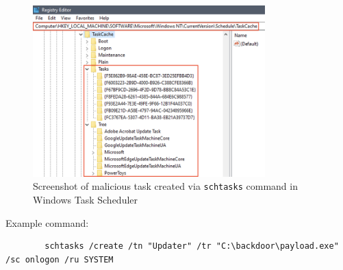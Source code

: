 

\begin{figure}[H]
    \centering
    \includegraphics[width=0.8\textwidth]{Pictures/Fig1_Tarrask-malware-creates-new-registry-keys-along-with-the-creation-of-new-scheduled-tasks.png}
    \caption{Screenshot of malicious task created via \texttt{schtasks} command in Windows Task Scheduler}
    \label{fig:malicious_task_scheduler}
\end{figure}


Example command:
\begin{verbatim}
        schtasks /create /tn "Updater" /tr "C:\backdoor\payload.exe" /sc onlogon /ru SYSTEM
\end{verbatim}


